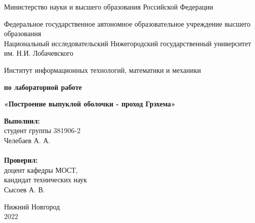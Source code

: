 \documentclass{report}
\begin{document}
\begin{titlepage}

\begin{center}
Министерство науки и высшего образования Российской Федерации
\end{center}

\begin{center}
Федеральное государственное автономное образовательное учреждение высшего образования \\
Национальный исследовательский Нижегородский государственный университет им. Н.И. Лобачевского
\end{center}

\begin{center}
Институт информационных технологий, математики и механики
\end{center}

\vspace{4em}

\begin{center}
\textbf{ по лабораторной работе} \\
\end{center}
\begin{center}
\textbf{\Large«Построение выпуклой оболочки - проход Грэхема»} \\
\end{center}

\vspace{4em}

\newbox{\lbox}
\newlength{\maxl}
\setlength{\maxl}{\wd\lbox}
\hfill\parbox{7cm}{
\hspace*{5cm}\hspace*{-5cm}\textbf{Выполнил:} \\ студент группы 381906-2 \\ Челебаев А. А.\\
\\
\hspace*{5cm}\hspace*{-5cm}\textbf{Проверил:}\\ доцент кафедры МОСТ, \\ кандидат технических наук \\ Сысоев А. В.\\
}
\vspace{\fill}

\begin{center} Нижний Новгород \\ 2022 \end{center}

\end{titlepage}
\end{document}
